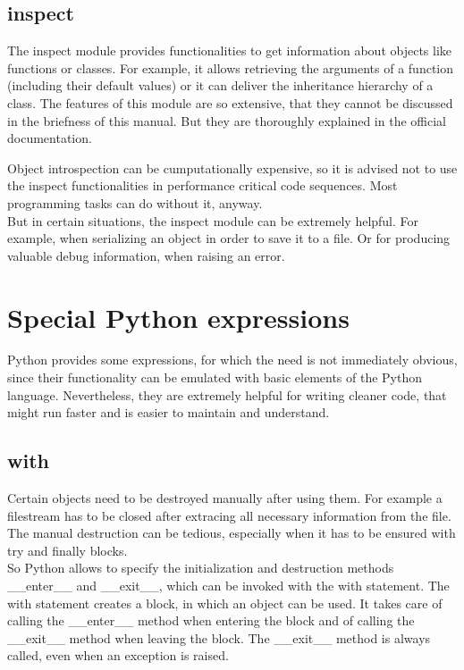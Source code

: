 		\subsection{inspect}
			The inspect module provides functionalities to get information about objects like functions or classes.
			For example, it allows retrieving the arguments of a function (including their default values) or it can deliver the inheritance hierarchy of a class.
			The features of this module are so extensive, that they cannot be discussed in the briefness of this manual.
			But they are thoroughly explained in the official documentation.

			Object introspection can be cumputationally expensive, so it is advised not to use the inspect functionalities in performance critical code sequences.
			Most programming tasks can do without it, anyway.\\
			But in certain situations, the inspect module can be extremely helpful.
			For example, when serializing an object in order to save it to a file.
			Or for producing valuable debug information, when raising an error.


	\section{Special Python expressions}
		Python provides some expressions, for which the need is not immediately obvious, since their functionality can be emulated with basic elements of the Python language.
		Nevertheless, they are extremely helpful for writing cleaner code, that might run faster and is easier to maintain and understand.

		\subsection{with}
			Certain objects need to be destroyed manually after using them.
			For example a filestream has to be closed after extracing all necessary information from the file.\\
			The manual destruction can be tedious, especially when it has to be ensured with {\normalfont \ttfamily try} and {\normalfont \ttfamily finally} blocks.\\
			So Python allows to specify the initialization and destruction methods {\normalfont \ttfamily \_\_enter\_\_} and {\normalfont \ttfamily \_\_exit\_\_}, which can be invoked with the {\normalfont \ttfamily with} statement.
			The {\normalfont \ttfamily with} statement creates a block, in which an object can be used.
			It takes care of calling the {\normalfont \ttfamily \_\_enter\_\_} method when entering the block and of calling the {\normalfont \ttfamily \_\_exit\_\_} method when leaving the block.
			The {\normalfont \ttfamily \_\_exit\_\_} method is always called, even when an exception is raised.

